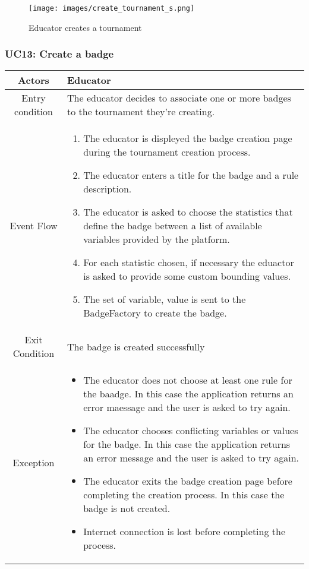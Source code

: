 \documentclass[a4paper, 11pt, titlepage]{article}
\begin{document}
\begin{figure}[h!]
    \centering
    \texttt{[image: images/create\_tournament\_s.png]}
    \caption{Educator creates a tournament}
    \label{fig:seq_diag_create_tournament}
    
\end{figure}
\clearpage

\subsubsection*{UC13: Create a badge}
\begin{center}
    \begin{tabularx}{\linewidth} {|c|X|}
        \hline 
        Actors & Educator\\
        \hline 
        Entry condition &
        The educator decides to associate one or more badges to the tournament they're creating.\\
        \hline 
        Event Flow &
        \begin{enumerate}
            \item The educator is displeyed the badge creation page during the tournament creation process.
            \item The educator enters a title for the badge and a rule description.
            \item The educator is asked to choose the statistics that define the badge between a list of available variables provided by the platform.
            \item For each statistic chosen, if necessary the eduactor is asked to provide some custom bounding values.
            \item The set of variable, value is sent to the BadgeFactory to create the badge.  
        \end{enumerate}
        \\
        \hline 
        Exit Condition &
        The badge is created successfully\\
        \hline 
        Exception & 
        \begin{itemize}
            \item The educator does not choose at least one rule for the baadge. In this case the application returns an error maessage and the user is asked to try again.
            \item The educator chooses conflicting variables or values for the badge. In this case the application returns an error message and the user is asked to try again.
            \item The educator exits the badge creation page before completing the creation process. In this case the badge is not created.
            \item Internet connection is lost before completing the process. 
        \end{itemize}\\
        \hline
    \end{tabularx}
\end{center}
\end{document}
